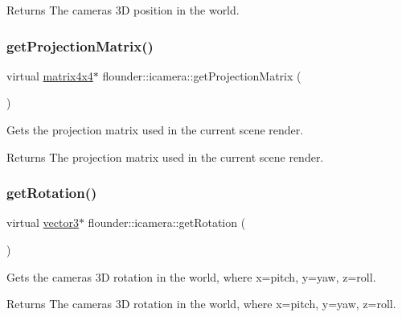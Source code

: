 \begin{DoxyReturn}{Returns}
The cameras 3D position in the world. 
\end{DoxyReturn}
\mbox{\label{classflounder_1_1icamera_a551908ec508ef29f1652c830cbe554f4}} 
\subsubsection{\texorpdfstring{get\+Projection\+Matrix()}{getProjectionMatrix()}}
{\footnotesize\ttfamily virtual \hyperlink{classflounder_1_1matrix4x4}{matrix4x4}$\ast$ flounder\+::icamera\+::get\+Projection\+Matrix (\begin{DoxyParamCaption}{ }\end{DoxyParamCaption})\hspace{0.3cm}{\ttfamily [pure virtual]}}



Gets the projection matrix used in the current scene render. 

\begin{DoxyReturn}{Returns}
The projection matrix used in the current scene render. 
\end{DoxyReturn}
\mbox{\label{classflounder_1_1icamera_aa4d73bdf412e90c6d8747fc075568ff1}} 
\subsubsection{\texorpdfstring{get\+Rotation()}{getRotation()}}
{\footnotesize\ttfamily virtual \hyperlink{classflounder_1_1vector3}{vector3}$\ast$ flounder\+::icamera\+::get\+Rotation (\begin{DoxyParamCaption}{ }\end{DoxyParamCaption})\hspace{0.3cm}{\ttfamily [pure virtual]}}



Gets the cameras 3D rotation in the world, where x=pitch, y=yaw, z=roll. 

\begin{DoxyReturn}{Returns}
The cameras 3D rotation in the world, where x=pitch, y=yaw, z=roll. 
\end{DoxyReturn}
\mbox{\label{classflounder_1_1icamera_a6727d2cb720be2830e44ece8ad8e106b}} 
